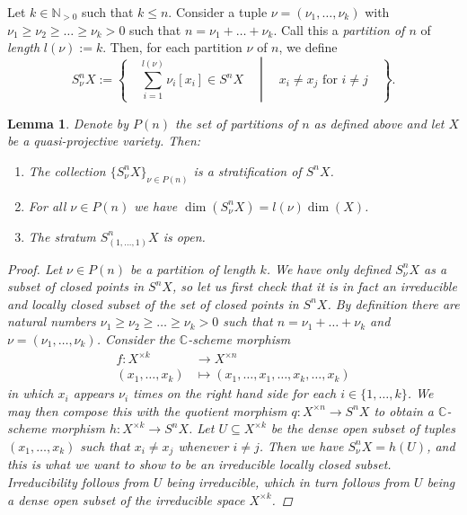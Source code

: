 \documentclass[12pt,a4paper]{amsart}
\theoremstyle{plain}
\newtheorem{lm}[thm]{Lemma}
\theoremstyle{definition}
\theoremstyle{remark}
\begin{document}
Let $k \in \mathbb{N}_{>0}$ such that $k \leq n$.
Consider a tuple $\nu = (\nu_{1}, \ldots, \nu_{k})$ with $\nu_{1} \geq \nu_{2} \geq \ldots \geq \nu_{k} > 0$ such that $n = \nu_{1} + \ldots + \nu_{k}$.
Call this a \textit{partition of $n$} of \textit{length} $l(\nu) := k$.
Then, for each partition $\nu$ of $n$, we define
\[ S^{n}_{\nu}X := \left\{ \quad \sum_{i = 1}^{l(\nu)} \nu_{i}[x_{i}] \in S^{n}X \quad \middle| \quad x_{i} \neq x_{j} \text{ for } i \neq j \quad \right\}. \]

\begin{lm}\label{lm:stratification}
  Denote by $P(n)$ the set of partitions of $n$ as defined above and let $X$ be a quasi-projective variety.
  Then:
  \begin{enumerate}[label=(\roman*)]
    \item The collection $\{ S_{\nu}^{n}X \}_{\nu \in P(n)}$ is a stratification of $S^{n}X$.
    \item For all $\nu \in P(n)$ we have $\dim(S_{\nu}^{n}X) = l(\nu)\dim(X)$.
    \item The stratum $S_{(1,\ldots,1)}^{n}X$ is open.
  \end{enumerate} 
  \begin{proof}
    Let $\nu \in P(n)$ be a partition of length $k$.
    We have only defined $S^{n}_{\nu}X$ as a subset of closed points in $S^{n}X$, so let us first check that it is in fact an irreducible and locally closed subset of the set of closed points in $S^{n}X$.
    By definition there are natural numbers $\nu_{1} \geq \nu_{2} \geq \ldots \geq \nu_{k} > 0$ such that $n = \nu_{1} + \ldots + \nu_{k}$ and $\nu = (\nu_{1},\ldots, \nu_{k})$.
    Consider the $\mathbb{C}$-scheme morphism
    \begin{align*}
      f \colon X^{\times k} & \longrightarrow X^{\times n} \\
      (x_{1}, \ldots, x_{k}) & \longmapsto (x_{1}, \ldots, x_{1}, \ldots, x_{k}, \ldots, x_{k})
    \end{align*}
    in which $x_{i}$ appears $\nu_{i}$ times on the right hand side for each $i \in \{1, \ldots, k \}$.
    We may then compose this with the quotient morphism $q \colon X^{\times n} \to S^{n}X$ to obtain a $\mathbb{C}$-scheme morphism $h \colon X^{\times k} \to S^{n}X$.
    Let $U \subseteq X^{\times k}$ be the dense open subset of tuples $(x_{1}, \ldots, x_{k})$ such that $x_{i} \neq x_{j}$ whenever $i \neq j$.
    Then we have $S^{n}_{\nu}X = h(U)$, and this is what we want to show to be an irreducible locally closed subset.
    Irreducibility follows from $U$ being irreducible, which in turn follows from $U$ being a dense open subset of the irreducible space $X^{\times k}$.

\end{proof}
\end{lm}
\end{document}
